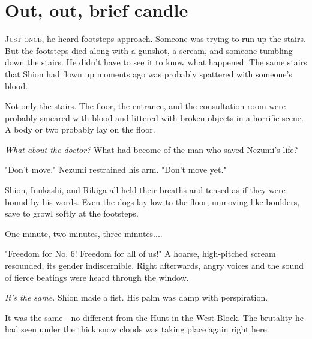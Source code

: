
\chapter{Out, out, brief candle}


\lettrine{J}{ust once}, he heard footsteps approach. Someone was trying to run up the
stairs. But the footsteps died along with a gunshot, a scream, and
someone tumbling down the stairs. He didn't have to see it to know what
happened. The same stairs that Shion had flown up moments ago was
probably spattered with someone's blood.

Not only the stairs. The floor, the entrance, and the consultation room
were probably smeared with blood and littered with broken objects in a
horrific scene. A body or two probably lay on the floor.

\emph{What about the doctor?} What had become of the man who saved Nezumi's
life?

"Don't move." Nezumi restrained his arm. "Don't move yet."

Shion, Inukashi, and Rikiga all held their breaths and tensed as if they
were bound by his words. Even the dogs lay low to the floor, unmoving
like boulders, save to growl softly at the footsteps.

One minute, two minutes, three minutes....

"Freedom for No. 6! Freedom for all of us!" A hoarse, high-pitched
scream resounded, its gender indiscernible. Right afterwards, angry
voices and the sound of fierce beatings were heard through the window.

\emph{It's the same.} Shion made a fist. His palm was damp with perspiration.

It was the same―no different from the Hunt in the West Block. The
brutality he had seen under the thick snow clouds was taking place again
right here.

